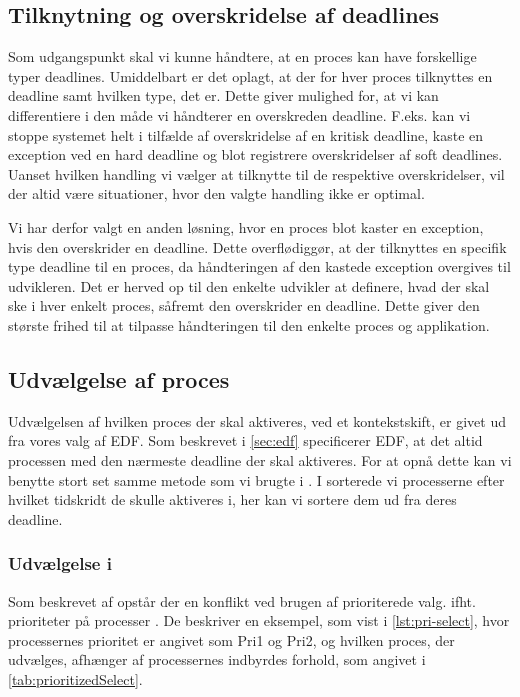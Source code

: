 \subsection{Tilknytning og overskridelse af deadlines}
Som udgangspunkt skal vi kunne håndtere, at en proces kan have forskellige typer deadlines. Umiddelbart er det oplagt, at der for hver proces tilknyttes en deadline samt hvilken type, det er. Dette giver mulighed for, at vi kan differentiere i den måde vi håndterer en overskreden deadline. F.eks. kan vi stoppe systemet helt i tilfælde af overskridelse af en kritisk deadline, kaste en exception ved en hard deadline og blot registrere overskridelser af soft deadlines. Uanset hvilken handling vi vælger at tilknytte til de respektive overskridelser, vil der altid være situationer, hvor den valgte handling ikke er optimal. 

Vi har derfor valgt en anden løsning, hvor en proces blot kaster en exception, hvis den overskrider en deadline. Dette overflødiggør, at der tilknyttes en specifik type deadline til en proces, da håndteringen af den kastede exception overgives til udvikleren. Det er herved op til den enkelte udvikler at definere, hvad der skal ske i hver enkelt proces, såfremt den overskrider en deadline. Dette giver den største frihed til at tilpasse håndteringen til den enkelte proces og applikation. 

\subsection{Udvælgelse af proces}
Udvælgelsen af hvilken proces der skal aktiveres, ved et kontekstskift, er givet ud fra vores valg af EDF. Som beskrevet i \cref{sec:edf} specificerer EDF, at det altid processen med den nærmeste deadline der skal aktiveres. For at opnå dette kan vi benytte stort set samme metode som vi brugte i \des. I \des sorterede vi processerne efter hvilket tidskridt de skulle aktiveres i, her kan vi sortere dem ud fra deres deadline.  

\subsubsection{Udvælgelse i }
Som  beskrevet af \citeauthor{Burns1990} opstår der en konflikt ved brugen af  prioriterede valg. ifht. prioriteter på processer \cite{Burns1990}. De beskriver en eksempel, som vist i \cref{lst:pri-select}, hvor processernes prioritet er angivet som Pri1 og Pri2, og hvilken proces, der udvælges, afhænger af processernes indbyrdes forhold, som angivet i \cref{tab:prioritizedSelect}.



